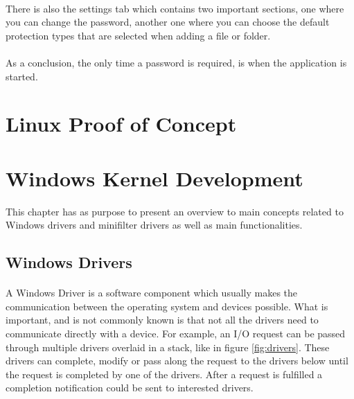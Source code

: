 	\paragraph{}
	There is also the settings tab which contains two important sections, one where you can change the password, another one where you can choose the default protection types that are selected when adding a file or folder.
	
	\paragraph{}
	As a conclusion, the only time a password is required, is when the application is started. 
	
	\newpage
	\section{Linux Proof of Concept}
	
	
	\newpage
	\section{Windows Kernel Development}
		This chapter has as purpose to present an overview to main concepts related to Windows drivers and minifilter drivers as well as main functionalities.
	
		\subsection{Windows Drivers}
		\paragraph{}
		A Windows Driver is a software component which usually makes the communication between the operating system and devices possible. What is important, and is not commonly known is that not all the drivers need to communicate directly with a device. For example, an I/O request can be passed through multiple drivers overlaid in a stack, like in figure \ref{fig:drivers}. These drivers can complete, modify or pass along the request to the drivers below until the request is completed by one of the drivers. After a request is fulfilled a completion notification could be sent to interested drivers.  \cite{MSDNWhatIsADriver}
		
